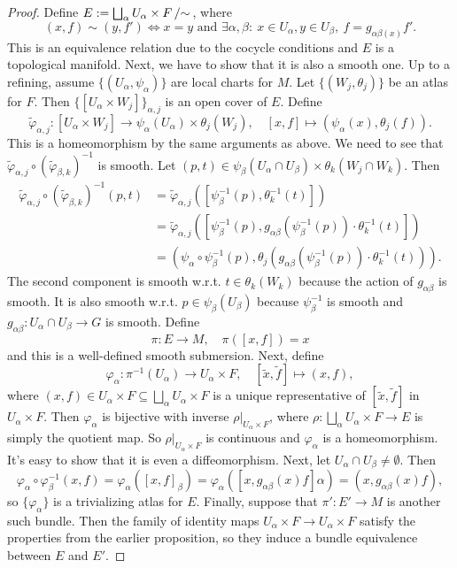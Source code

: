 \documentclass[10pt, a4paper]{article}
\newenvironment{noticeC}{%
  \tcolorbox[%
  notitle,
  empty,
  enhanced,  %
  breakable,
  coltext=black, 
  fontupper=\rmfamily,
  noparskip,
  sharp corners,
  boxrule=-1pt,  %
  frame hidden,
  left=7pt,  %
  right=7pt,
  top=5pt,
  bottom=5pt,
  before skip=2.5ex plus 2pt,
  after skip=2.5ex plus 2pt,
  overlay unbroken and last={%
  },
  ]}
{\endtcolorbox}
\newenvironment{myproof}%
  {\begin{noticeC}\begin{proof}}%
  {\end{proof}\end{noticeC}}
\newcommand{\quot}[2]{{\raisebox{0em}{$#1$}\left/\raisebox{0em}{$#2$}\right.}}
\begin{document}
\begin{myproof}
  Define $E := \quot{\bigsqcup_\alpha U_\alpha \times F}{\sim}$, where 
  $$(x, f) \sim (y, f') \Leftrightarrow \textrm{$x = y$ and $\exists \alpha, \beta:\ x \in U_\alpha, y \in U_\beta,\ f = g_{\alpha \beta (x)} f'$}.$$
  This is an equivalence relation due to the cocycle conditions and $E$ is a topological manifold.
  Next, we have to show that it is also a smooth one. Up to a refining, assume $\{(U_\alpha, \psi_\alpha)\}$ are local charts for $M$.
  Let $\{(W_j, \theta_j)\}$ be an atlas for $F$. Then $\{[U_\alpha \times W_j]\}_{\alpha, j}$ is an open cover of $E$.
  Define $$\widetilde{\varphi}_{\alpha, j}: [U_\alpha \times W_j] \to \psi_\alpha (U_\alpha) \times \theta_j (W_j),\quad [x, f] \mapsto (\psi_\alpha (x), \theta_j (f)).$$
  This is a homeomorphism by the same arguments as above. We need to see that 
  $\widetilde{\varphi}_{\alpha, j} \circ (\widetilde{\varphi}_{\beta, k})^{-1}$ is smooth.
  Let $(p, t) \in \psi_\beta (U_\alpha \cap U_\beta) \times \theta_k (W_j \cap W_k)$.
  Then 
  \begin{align*}
    \widetilde{\varphi}_{\alpha, j} \circ (\widetilde{\varphi}_{\beta, k})^{-1} (p, t) &= \widetilde{\varphi}_{\alpha, j} ([\psi^{-1} _\beta (p), \theta_k ^{-1} (t)])\\
    &= \widetilde{\varphi}_{\alpha, j} ([\psi^{-1} _\beta (p), g_{\alpha\beta} (\psi_{\beta} ^{-1} (p)) \cdot \theta_k ^{-1} (t)])\\
    &= (\psi_\alpha \circ \psi_\beta ^{-1} (p), \theta_j (g_{\alpha\beta} (\psi_{\beta} ^{-1} (p)) \cdot \theta_k ^{-1} (t))).
  \end{align*}
  The second component is smooth w.r.t. $t \in \theta_k (W_k)$ because the action of $g_{\alpha \beta}$ is smooth.
  It is also smooth w.r.t. $p \in \psi_\beta (U_\beta)$ because $\psi_\beta ^{-1}$ is smooth and $g_{\alpha \beta}: U_\alpha \cap U_\beta \to G$
  is smooth. Define $$\pi: E \to M,\quad \pi ([x, f]) = x$$ and this is a well-defined smooth submersion.
  Next, define $$\varphi_\alpha : \pi^{-1} (U_\alpha) \to U_\alpha \times F,\quad [\widetilde{x}, \widetilde{f}] \mapsto (x, f),$$
  where $(x, f) \in U_\alpha \times F \subseteq \bigsqcup_\alpha U_\alpha \times F$
  is a unique representative of $[\widetilde{x}, \widetilde{f}]$ in $U_\alpha \times F$.
  Then $\varphi_\alpha$ is bijective with inverse $\rho\big|_{U_\alpha \times F}$, where 
  $\rho: \bigsqcup_\alpha U_\alpha \times F \to E$ is simply the quotient map.
  So $\rho \big|_{U_\alpha \times F} $ is continuous and $\varphi_\alpha$ is a homeomorphism.
  It's easy to show that it is even a diffeomorphism.
  Next, let $U_\alpha \cap U_\beta \neq \emptyset$. Then 
  $$\varphi_\alpha \circ\varphi^{-1} _\beta (x, f) = \varphi_\alpha ([x, f]_\beta) = \varphi_\alpha ([x, g_{\alpha \beta} (x) f]\alpha) = (x, g_{\alpha \beta} (x) f),$$
  so $\{\varphi_\alpha\}$ is a trivializing atlas for $E$. Finally, suppose that $\pi': E' \to M$ is another such bundle. Then
  the family of identity maps $U_\alpha \times F \to U_\alpha \times F$ satisfy the properties from the earlier proposition, so they induce a bundle equivalence between $E$ and $E'$.
\end{myproof}
\end{document}
